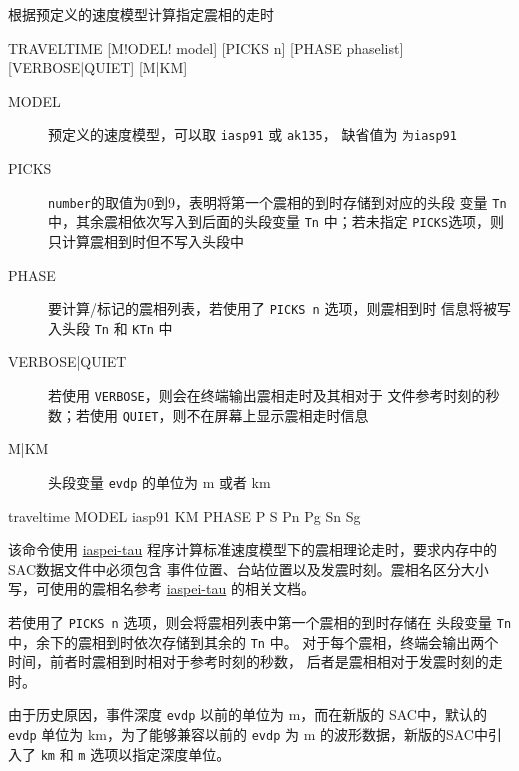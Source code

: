 \label{cmd:traveltime}

根据预定义的速度模型计算指定震相的走时

\begin{SACSTX}
TRAVELTIME [M!ODEL! model] [PICKS n] [PHASE phaselist]
    [VERBOSE|QUIET] [M|KM]
\end{SACSTX}

\begin{description}
\item [MODEL] 预定义的速度模型，可以取 \texttt{iasp91} 或 \texttt{ak135}，
    缺省值为 \texttt{为iasp91}
\item [PICKS] \texttt{number}的取值为0到9，表明将第一个震相的到时存储到对应的头段
    变量 \texttt{Tn} 中，其余震相依次写入到后面的头段变量 \texttt{Tn} 中；若未指定
    \texttt{PICKS}选项，则只计算震相到时但不写入头段中
\item [PHASE] 要计算/标记的震相列表，若使用了 \texttt{PICKS n} 选项，则震相到时
    信息将被写入头段 \texttt{Tn} 和 \texttt{KTn} 中
\item [VERBOSE|QUIET] 若使用 \texttt{VERBOSE}，则会在终端输出震相走时及其相对于
    文件参考时刻的秒数；若使用 \texttt{QUIET}，则不在屏幕上显示震相走时信息
\item [M|KM] 头段变量 \texttt{evdp} 的单位为 \si{\m} 或者 \si{\km}
\end{description}

\begin{SACDFT}
traveltime MODEL iasp91 KM PHASE P S Pn Pg Sn Sg
\end{SACDFT}

该命令使用 \href{https://seiscode.iris.washington.edu/projects/iaspei-tau}{iaspei-tau}
程序计算标准速度模型下的震相理论走时，要求内存中的SAC数据文件中必须包含
事件位置、台站位置以及发震时刻。震相名区分大小写，可使用的震相名参考
\href{https://seiscode.iris.washington.edu/projects/iaspei-tau}{iaspei-tau}
的相关文档。

若使用了 \texttt{PICKS n} 选项，则会将震相列表中第一个震相的到时存储在
头段变量 \texttt{Tn} 中，余下的震相到时依次存储到其余的 \texttt{Tn} 中。
对于每个震相，终端会输出两个时间，前者时震相到时相对于参考时刻的秒数，
后者是震相相对于发震时刻的走时。

由于历史原因，事件深度 \texttt{evdp} 以前的单位为 \si{\m}，而在新版的
SAC中，默认的 \texttt{evdp} 单位为 \si{\km}，为了能够兼容以前的
\texttt{evdp} 为 \si{\m} 的波形数据，新版的SAC中引入了 \texttt{km} 和
\texttt{m} 选项以指定深度单位。

